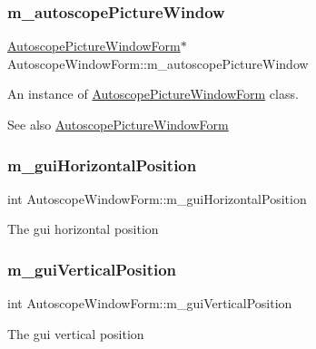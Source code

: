 \subsubsection{\texorpdfstring{m\_autoscopePictureWindow}{m\_autoscopePictureWindow}}
{\footnotesize\ttfamily \mbox{\hyperlink{class_autoscope_picture_window_form}{Autoscope\+Picture\+Window\+Form}}$\ast$ Autoscope\+Window\+Form\+::m\+\_\+autoscope\+Picture\+Window\hspace{0.3cm}{\ttfamily [private]}}



An instance of \mbox{\hyperlink{class_autoscope_picture_window_form}{Autoscope\+Picture\+Window\+Form}} class. 

\begin{DoxySeeAlso}{See also}
\mbox{\hyperlink{class_autoscope_picture_window_form}{Autoscope\+Picture\+Window\+Form}} 
\end{DoxySeeAlso}
\mbox{\label{class_autoscope_window_form_a729b0f3174ac22f142a78dbc6d2677be}} 
\subsubsection{\texorpdfstring{m\_guiHorizontalPosition}{m\_guiHorizontalPosition}}
{\footnotesize\ttfamily int Autoscope\+Window\+Form\+::m\+\_\+gui\+Horizontal\+Position\hspace{0.3cm}{\ttfamily [private]}}

The gui horizontal position \mbox{\label{class_autoscope_window_form_abfd03b3848ab390f59cfe1778595bcb8}} 
\subsubsection{\texorpdfstring{m\_guiVerticalPosition}{m\_guiVerticalPosition}}
{\footnotesize\ttfamily int Autoscope\+Window\+Form\+::m\+\_\+gui\+Vertical\+Position\hspace{0.3cm}{\ttfamily [private]}}

The gui vertical position \mbox{\label{class_autoscope_window_form_a6dbb17c9dce12f2a8775e1510b0139e9}} 

